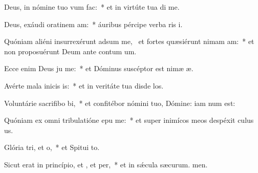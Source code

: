 \item Deus, in nómine tuo vum  fac:~* et in virtúte tua di me.
\item Deus, exáudi oratinem am:~* áuribus pércipe verba ris i.
\item Quóniam aliéni insurrexérunt adsum me,~\pscross{} et fortes quæsiérunt nimam am:~* et non proposuérunt Deum ante contum um.
\item Ecce enim Deus ju me:~* et Dóminus suscéptor est nimæ æ.
\item Avérte mala inicis is:~* et in veritáte tua disde los.
\item Voluntárie sacrifibo bi,~* et confitébor nómini tuo, Dómine: iam num est:
\item Quóniam ex omni tribulatióne epu me:~* et super inimícos meos despéxit culus us.
\item Glória tri, et o,~* et Spitui to.
\item Sicut erat in princípio, et , et per,~* et in sǽcula sæcurum. men.

